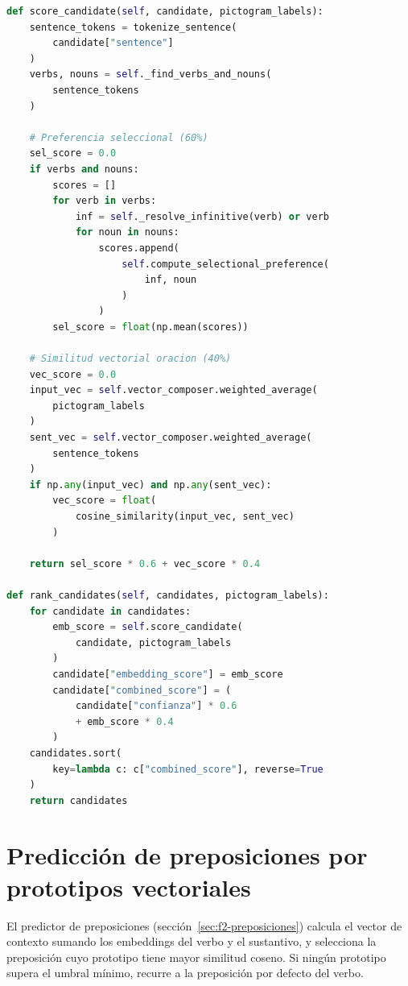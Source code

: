 \begin{lstlisting}[language=Python,caption={Scoring y ranking de candidatos (\texttt{semantic\_scorer.py}).},label={lst:ranking-candidatos},basicstyle=\ttfamily\small,xleftmargin=1cm]
def score_candidate(self, candidate, pictogram_labels):
    sentence_tokens = tokenize_sentence(
        candidate["sentence"]
    )
    verbs, nouns = self._find_verbs_and_nouns(
        sentence_tokens
    )

    # Preferencia seleccional (60%)
    sel_score = 0.0
    if verbs and nouns:
        scores = []
        for verb in verbs:
            inf = self._resolve_infinitive(verb) or verb
            for noun in nouns:
                scores.append(
                    self.compute_selectional_preference(
                        inf, noun
                    )
                )
        sel_score = float(np.mean(scores))

    # Similitud vectorial oracion (40%)
    vec_score = 0.0
    input_vec = self.vector_composer.weighted_average(
        pictogram_labels
    )
    sent_vec = self.vector_composer.weighted_average(
        sentence_tokens
    )
    if np.any(input_vec) and np.any(sent_vec):
        vec_score = float(
            cosine_similarity(input_vec, sent_vec)
        )

    return sel_score * 0.6 + vec_score * 0.4

def rank_candidates(self, candidates, pictogram_labels):
    for candidate in candidates:
        emb_score = self.score_candidate(
            candidate, pictogram_labels
        )
        candidate["embedding_score"] = emb_score
        candidate["combined_score"] = (
            candidate["confianza"] * 0.6
            + emb_score * 0.4
        )
    candidates.sort(
        key=lambda c: c["combined_score"], reverse=True
    )
    return candidates
\end{lstlisting}

\section{Predicción de preposiciones por prototipos vectoriales}

El predictor de preposiciones (sección~\ref{sec:f2-preposiciones}) calcula el vector de contexto sumando los embeddings del verbo y el sustantivo, y selecciona la preposición cuyo prototipo tiene mayor similitud coseno. Si ningún prototipo supera el umbral mínimo, recurre a la preposición por defecto del verbo.

